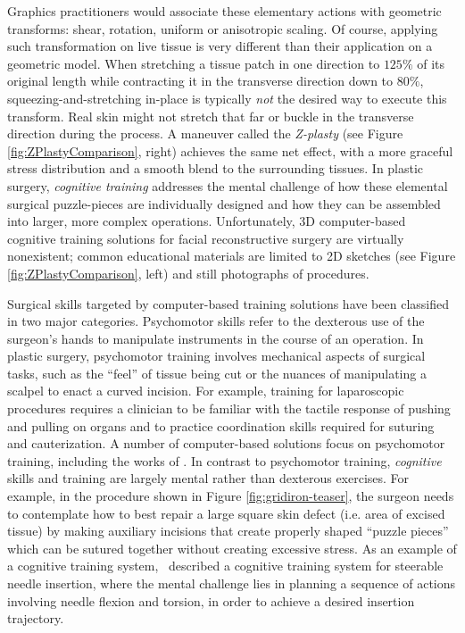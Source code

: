 Graphics practitioners would associate these elementary actions with
geometric transforms: shear, rotation, uniform or anisotropic
scaling. Of course, applying such transformation on live tissue is
very different than their application on a geometric model. When
stretching a tissue patch in one direction to $125\%$ of its original
length while contracting it in the transverse direction down to
$80\%$, squeezing-and-stretching in-place is typically \emph{not} the
desired way to execute this transform. Real skin might not stretch
that far or buckle in the transverse direction during the process. A
maneuver called the \emph{Z-plasty} (see Figure
\ref{fig:ZPlastyComparison}, right) achieves the same net effect, with
a more graceful stress distribution and a smooth blend to the
surrounding tissues. In plastic surgery, \textit{cognitive training}
addresses the mental challenge of how these elemental surgical
puzzle-pieces are individually designed and how they can be assembled
into larger, more complex operations. Unfortunately, 3D computer-based
cognitive training solutions for facial reconstructive surgery are
virtually nonexistent; common educational materials are limited to 2D
sketches (see Figure \ref{fig:ZPlastyComparison}, left) and still
photographs of procedures.

Surgical skills targeted by computer-based training solutions have
been classified \cite{GallaRCHFMSS:2005} in two major
categories. Psychomotor skills refer to the dexterous use of the
surgeon's hands to manipulate instruments in the course of an
operation. In plastic surgery, psychomotor training involves
mechanical aspects of surgical tasks, such as the ``feel'' of tissue
being cut or the nuances of manipulating a scalpel to enact a curved
incision. For example, training for laparoscopic procedures requires a
clinician to be familiar with the tactile response of pushing and
pulling on organs and to practice coordination skills required for
suturing and cauterization.  A number of computer-based solutions
focus on psychomotor training, including the works of
\cite{MendoL:2003,DeKLS:2005,KimCDS:2007,LindbT:2007}.  In contrast to
psychomotor training, \emph{cognitive} skills and training are largely
mental rather than dexterous exercises. For example, in the procedure
shown in Figure \ref{fig:gridiron-teaser}, the surgeon needs to
contemplate how to best repair a large square skin defect (i.e. area
of excised tissue) by making auxiliary incisions that create properly
shaped ``puzzle pieces'' which can be sutured together without
creating excessive stress. As an example of a cognitive training
system,~\cite{ChentARCHGSO:2009} described a cognitive training system
for steerable needle insertion, where the mental challenge lies in
planning a sequence of actions involving needle flexion and torsion,
in order to achieve a desired insertion trajectory.

